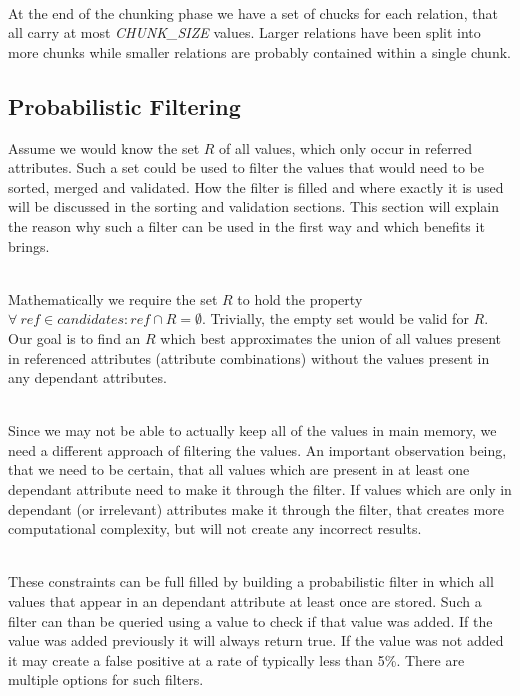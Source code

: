 \noindent \\ At the end of the chunking phase we have a set of chucks for each relation, that all carry at most \textit{CHUNK\_SIZE} values. Larger relations have been split into more chunks while smaller relations are probably contained within a single chunk.

\subsection{Probabilistic Filtering}
Assume we would know the set $R$ of all values, which only occur in referred attributes. Such a set could be used to filter the values that would need to be sorted, merged and validated. How the filter is filled and where exactly it is used will be discussed in the sorting and validation sections. This section will explain the reason why such a filter can be used in the first way and which benefits it brings.

\noindent \\ Mathematically we require the set $R$ to hold the property $\forall \: ref \in candidates : ref \cap R = \emptyset$. Trivially, the empty set would be valid for $R$. Our goal is to find an $R$ which best approximates the union of all values present in referenced attributes (attribute combinations) without the values present in any dependant attributes.

\noindent \\ Since we may not be able to actually keep all of the values in main memory, we need a different approach of filtering the values. An important observation being, that we need to be certain, that all values which are present in at least one dependant attribute need to make it through the filter. If values which are only in dependant (or irrelevant) attributes make it through the filter, that creates more computational complexity, but will not create any incorrect results.

\noindent \\ These constraints can be full filled by building a probabilistic filter in which all values that appear in an dependant attribute at least once are stored. Such a filter can than be queried using a value to check if that value was added. If the value was added previously it will always return true. If the value was not added it may create a false positive at a rate of typically less than 5\%. There are multiple options for such filters.

